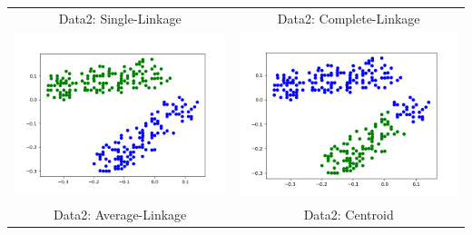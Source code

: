 \documentclass{article}
\begin{document}
\begin{tabular}{c|c}
{Data2: Single-Linkage}&{Data2: Complete-Linkage}\\
\includegraphics[scale=0.4]{hac_images/data2average.png}&\includegraphics[scale=0.4]{hac_images/data2centroid.png}\\
{Data2: Average-Linkage}&{Data2: Centroid}\\

\end{tabular}
\end{document}
